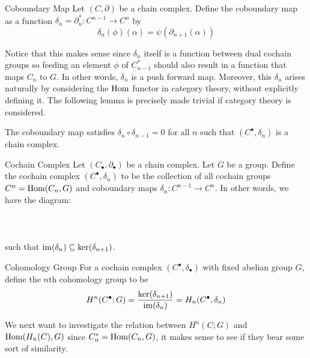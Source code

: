 \documentclass[a4paper]{article}
\begin{document}
\begin{defn}{Coboundary Map}{} Let $(C,\partial)$ be a chain complex. Define the coboundary map as a function $\delta_n=\partial_n^\ast:C^{n-1}\to C^n$ by $$\delta_n(\phi)(\alpha)=\psi(\partial_{n+1}(\alpha))$$
\end{defn}

Notice that this makes sense since $\delta_n$ itself is a function between dual cochain groups so feeding an element $\phi$ of $C_{n-1}^\ast$ should also result in a function that maps $C_n$ to $G$. In other words, $\delta_n$ is a push forward map. Moreover, this $\delta_n$ arises naturally by considering the $\operatorname{Hom}$ functor in category theory, without explicitly defining it. The following lemma is precisely made trivial if category theory is considered. 

\begin{lmm}{}{} The coboundary map satisfies $\delta_n\circ\delta_{n-1}=0$ for all $n$ such that $(C^\bullet,\delta_n)$ is a chain complex. 
\end{lmm}

\begin{defn}{Cochain Complex}{} Let $(C_\bullet,\partial_\bullet)$ be a chain complex. Let $G$ be a group. Define the cochain complex $(C^\bullet,\delta_n)$ to be the collection of all cochain groups $C^n=\operatorname{Hom}(C_n,G)$ and coboundary maps $\delta_n:C^{n-1}\to C^n$. In other words, we have the diagram: \\~\\
\\~\\
such that $\operatorname{im}(\delta_n)\subseteq\ker(\delta_{n+1})$. 
\end{defn}

\begin{defn}{Cohomology Group}{} For a cochain complex $(C^\bullet,\delta_\bullet)$ with fixed abelian group $G$, define the $n$th cohomology group to be $$H^n(C^\bullet;G)=\frac{\ker(\delta_{n+1})}{\operatorname{im}(\delta_n)}=H_n(C^\bullet,\delta_n)$$
\end{defn}

We next want to investigate the relation between $H^n(C;G)$ and $\operatorname{Hom}(H_n(C),G)$ since $C_n^\ast=\operatorname{Hom}(C_n,G)$, it makes sense to see if they bear some sort of similarity. 
\end{document}
